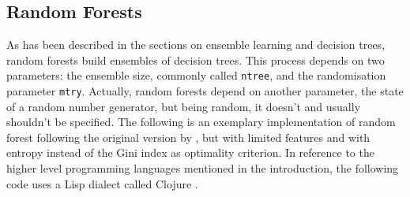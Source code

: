 \documentclass[a4paper,man,12pt,apacite,floatsintext,draftfirst]{apa6} %
\begin{document}
\subsection{Random Forests}
As has been described in the sections on ensemble learning and decision trees,
random forests build ensembles of decision trees.
This process depends on two parameters: the ensemble size, commonly called
\texttt{ntree}, and the randomisation parameter \texttt{mtry}.
Actually, random forests depend on another parameter,
the state of a random number generator, but being random,
it doesn't and usually shouldn't be specified.
The following is an exemplary implementation of random forest following the
original version by \cite{breiman2001random}, but with limited features and
with entropy instead of the Gini index as optimality criterion.
In reference to the higher level programming languages mentioned
in the introduction, the following code uses a Lisp
dialect called Clojure \cite{wpCLOJURE}.
\end{document}
